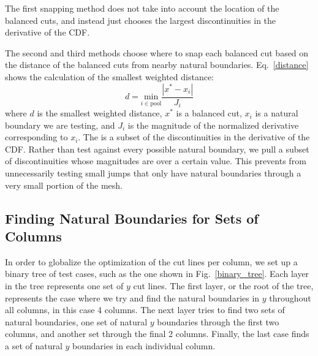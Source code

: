 The first snapping method does not take into account the location of the balanced cuts, and instead just chooses the largest discontinuities in the derivative of the CDF.

The second and third methods choose where to snap each balanced cut based on the distance of the balanced cuts from nearby natural boundaries. Eq.~\ref{distance} shows the calculation of the smallest weighted distance:
\begin{equation}
d = \underset{i \in \text{pool}}{\text{min}} \frac{|x^{*} - x_i|}{J_i}
\label{distance}
\end{equation}
where $d$ is the smallest weighted distance, $x^*$ is a balanced cut, $x_i$ is a natural boundary we are testing, and $J_i$ is the magnitude of the normalized derivative corresponding to $x_i$.
The  is a subset of the discontinuities in the derivative of the CDF.
Rather than test against every possible natural boundary, we pull a subset of discontinuities whose magnitudes are over a certain value.
This prevents from unnecessarily testing small jumps that only have natural boundaries through a very small portion of the mesh.

\FloatBarrier
\subsection{Finding Natural Boundaries for Sets of Columns}
In order to globalize the optimization of the cut lines per column, we set up a binary tree of test cases, such as the one shown in Fig.~\ref{binary_tree}. Each layer in the tree represents one set of $y$ cut lines. The first layer, or the root of the tree, represents the case where we try and find the natural boundaries in $y$ throughout all columns, in this case 4 columns. The next layer tries to find two sets of natural boundaries, one set of natural $y$ boundaries through the first two columns, and another set through the final 2 columns. Finally, the last case finds a set of natural $y$ boundaries in each individual column.

